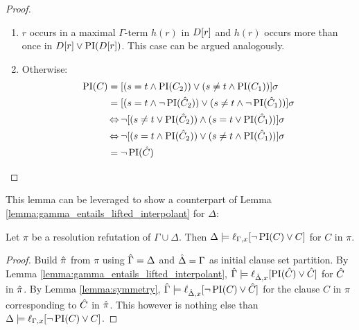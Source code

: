 \begin{proof}
\begin{itemize}
\begin{enumerate}
				\item $r$ occurs in a maximal $\Gamma$-term $h(r)$ in $D[r]$ and $h(r)$ occurs more than once in $D[r] \lor \operatorname{PI}(D[r])$.
					This case can be argued analogously.
				\item Otherwise:
					\begin{align*}
						\operatorname{PI}(C) &= [ ( s=t \land \operatorname{PI}(C_2) ) \lor (s\neq t \land \operatorname{PI}(C_1)) ]\sigma \\
									 &= [ ( s=t \land \lnot \operatorname{PI}(\hat{C}_2) ) \lor (s\neq t \land \lnot \operatorname{PI}(\hat{C}_1)) ]\sigma \\
									 &\operatorname{\Leftrightarrow} \lnot [ ( s\neq t \lor \operatorname{PI}(\hat{C}_2) ) \land (s=t \lor \operatorname{PI}(\hat{C}_1)) ]\sigma \\
									 &\operatorname{\Leftrightarrow} \lnot [ ( s=t \land \operatorname{PI}(\hat{C}_2) ) \lor (s\neq t \land \operatorname{PI}(\hat{C}_1)) ]\sigma \\
									 &= \lnot \operatorname{PI}(\hat{C})
					\qedhere
					\end{align*}
			\end{enumerate}


	\end{itemize}

\end{proof}

This lemma can be leveraged to show a counterpart of Lemma \ref{lemma:gamma_entails_lifted_interpolant} for $\Delta$:\nopagebreak

\begin{cor}
	\label{cor:delta_entails_lifted_interpolant}
	Let $\pi$ be a resolution refutation of $\Gamma \cup \Delta$. 
	Then $\Delta \models \ell_{\Gamma,x}[ \lnot \operatorname{PI}(C) \lor C ]$ for $C$ in $\pi$.
\end{cor}
\begin{proof}
	Build $\hat{\pi}$ from $\pi$ using $\hat{\Gamma} = \Delta$ and $\hat{\Delta} = \Gamma$ as initial clause set partition.
	\newline
	By Lemma \ref{lemma:gamma_entails_lifted_interpolant}, $\hat{\Gamma} \models \ell_{\hat{\Delta},x}[ \operatorname{PI}(\hat{C}) \lor \hat{C} ]$ for $\hat{C}$ in $\hat{\pi}$.
	\newline
	By Lemma \ref{lemma:symmetry},
$\hat{\Gamma} \models \ell_{\hat{\Delta},x}[ \lnot \operatorname{PI}(C) \lor \hat{C} ]$ for the clause $C$ in $\pi$ corresponding to $\hat{C}$ in $\hat{\pi}$. 
	This however is nothing else than 
$\Delta \entails\nolinebreak \lft{\Gamma}{x}{ \lnot \PI(C) \lor C }$.
\end{proof}

